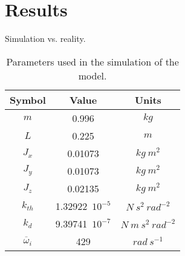 \section{Results}
Simulation vs. reality. \\

\begin{table}[H]
    \centering
    \begin{tabular}{c|c|c}
        \textbf{Symbol} &\textbf{Value} &\textbf{Units}\\
        \hline %
         $m$ & 0.996       &$kg$\\
        \hline %
        $L$  &   0.225       & $m$\\
        \hline %
        $J_x$  & 0.01073       & $kg \  m^2$\\
        \hline %
        $J_y$  & 0.01073       & $kg \  m^2$\\
        \hline %
        $J_z$  & 0.02135       & $kg \  m^2$\\
        \hline %
        $k_{th}$  & 1.32922\ $10^{-5}$       & $N \  s^2 \  rad^{-2}$\\
        \hline %
        $k_{d}$  & 9.39741\ $10^{-7}$       & $N \  m \  s^2 \  rad^{-2}$\\
        \hline
         $\overline{\omega}_i$& 429      & $rad \ s^{-1}$\\
         
    \end{tabular}
    \caption{Parameters used in the simulation of the model.}
    \label{ParametersQuadcopter}
\end{table}

